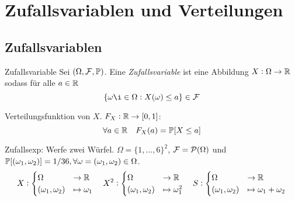 \section{Zufallsvariablen und Verteilungen}%
\label{sec:zuf[Aallsvariablen_und_verteilungen}
\subsection{Zufallsvariablen}%
\label{sub:zufallsvariablen}

\begin{definition}{Zufallsvariable}
	Sei $(\Omega, \mathcal{F} , \mathbb{P})$. Eine \emph{Zufallsvariable} ist eine Abbildung $X : \Omega \rightarrow \mathbb{R}$ sodass für alle
	$a \in \mathbb{R}$
	\begin{equation*}
		\{ \omega \i\in \Omega : X(\omega) \leq a \} \in \F
	\end{equation*}
\end{definition}
\begin{definition}{Verteilungsfunktion}
	von $X$. $F_X : \mathbb{R} \rightarrow [0,1]$:
	\begin{equation*}
		\forall a \in \mathbb{R} \quad F_X (a) = \mathbb{P} [X \leq a]
	\end{equation*}
\end{definition}
Zufallsexp: Werfe zwei Würfel. $\Omega = \{1, \ldots, 6\}^2$, $\mathcal{F} = \mathcal{P} (\Omega)$ und $\mathbb{P} [(\omega_1 ,\omega_2)] =
1/36, \forall \omega = (\omega_1, \omega_2) \in \Omega$.
\begin{equation*}
	X : 
	\begin{cases}
		\Omega & \rightarrow \mathbb{R}\\
		(\omega_1 , \omega_2) & \mapsto \omega_1
	\end{cases}
	\quad
	X^2 : 
	\begin{cases}
		\Omega & \rightarrow \mathbb{R}\\
		(\omega_1 , \omega_2) & \mapsto \omega_1^2
	\end{cases}
	\quad
	S : 
	\begin{cases}
		\Omega & \rightarrow \mathbb{R}\\
		(\omega_1 , \omega_2) & \mapsto \omega_1 + \omega_2
	\end{cases}
\end{equation*}
